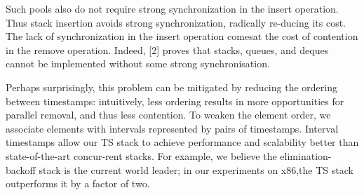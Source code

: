 Such pools also do not require strong synchronization in the insert operation.
Thus stack insertion avoids strong synchronization, radically re-ducing its cost.
The lack of synchronization in the insert operation comesat the cost of
contention in the remove operation. 
Indeed, [2] proves that stacks, queues, and deques cannot be implemented
without some strong synchronisation. 

Perhaps surprisingly, this problem can be mitigated by reducing the ordering
between timestamps: intuitively, less ordering results in more opportunities
for parallel removal, and thus less contention. 
To weaken the element order, we associate elements with intervals represented
by pairs of timestamps.
Interval timestamps allow our TS stack to achieve performance and scalability
better than state-of-the-art concur-rent stacks. 
For example, we believe the elimination-backoff stack is the current world
leader; in our experiments on x86,the TS stack outperforms it by a factor of
two.

